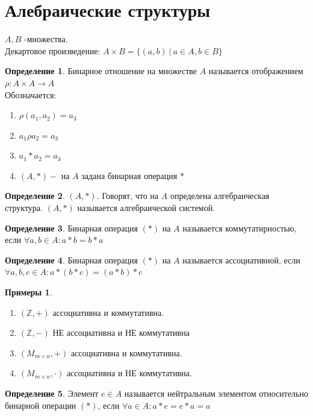 \documentclass[a4paper, 12pt]{article}
\newcommand{\Z}{\mathbb Z}
\newcommand\tab[1][.5cm]{\hspace*{#1}}
\theoremstyle{definition}
\newtheorem*{definition}{Определение}
\newtheorem*{example}{Примеры}
\begin{document}
  \section{Алебраические структуры}
  $A,B$ -множества. \\
  Декартовое произведение: $A \times B = \{(a,b)\ |\ a \in A, b \in B\}$ 
  \begin{definition}
    Бинарное отношение на множестве $A$ называется отображением $\rho:A \times A \to A$ \\
    Обозначается: \begin{enumerate}
      \item $\rho(a_1,a_2) = a_3$
      \item $a_1 \rho a_2 = a_3$
      \item $a_1 * a_2 = a_3$ 
      \item $(A, *) - $ на $A$ задана бинарная операция $*$ 
    \end{enumerate}
  \end{definition}    
  \begin{definition}
    $(A,*)$. Говорят, что на $A$ определена алгебраическая структура. $(A,*)$ называется алгебраической системой. 
  \end{definition} 
  \begin{definition}
    Бинарная операция $(*)$ на $A$ называется коммутатирностью, если $\forall a,b \in A: a*b=b*a$ 
  \end{definition} 
  \begin{definition}
    Бинарная операция $(*)$ на $A$ называется ассоциативной, если $\forall a,b,c \in A: a*(b*c)=(a*b)*c$ 
  \end{definition}
  \begin{example}
    \begin{enumerate} \tab
      \item $(\Z, +)$ ассоциативна и коммутативна. 
      \item $(\Z, -)$ НЕ ассоциативна и НЕ коммутативна
      \item $(M_{m \times n}, +)$ ассоциативна и коммутативна.
      \item $(M_{m \times n}, \cdot)$ ассоциативна и НЕ коммутативна.
    \end{enumerate}
  \end{example}
  \begin{definition}
    Элемент $e \in A$ называется нейтральным элементом относительно бинарной операции $(*)$, если $\forall a \in A: a*e = e*a = a$ 
  \end{definition} 
\end{document}
